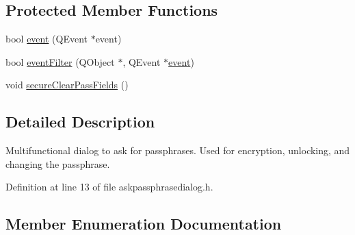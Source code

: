\subsection*{Protected Member Functions}
\begin{DoxyCompactItemize}
\item 
bool \hyperlink{class_ask_passphrase_dialog_ad309d9188638afd3288d0ab40ac3e817}{event} (Q\+Event $\ast$event)
\item 
bool \hyperlink{class_ask_passphrase_dialog_a97120d6400e135383876a358b35199c6}{event\+Filter} (Q\+Object $\ast$, Q\+Event $\ast$\hyperlink{class_ask_passphrase_dialog_ad309d9188638afd3288d0ab40ac3e817}{event})
\item 
void \hyperlink{class_ask_passphrase_dialog_a04d8cc5f111c5817875ea8720943e51b}{secure\+Clear\+Pass\+Fields} ()
\end{DoxyCompactItemize}


\subsection{Detailed Description}
Multifunctional dialog to ask for passphrases. Used for encryption, unlocking, and changing the passphrase. 

Definition at line 13 of file askpassphrasedialog.\+h.



\subsection{Member Enumeration Documentation}
\hypertarget{class_ask_passphrase_dialog_a96abf4d3c36c1ef9e268fb546ae76538}{}
